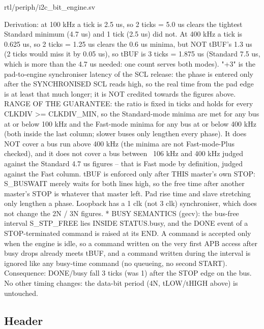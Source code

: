 \begin{relocated}{rtl/periph/i2c_bit_engine.sv}
\begin{textblock}
    Derivation: at 100 kHz a tick is 2.5 us, so 2 ticks = 5.0 us clears the tightest Standard
    minimum (4.7 us) and 1 tick (2.5 us) did not. At 400 kHz a tick is 0.625 us, so 2 ticks =
    1.25 us clears the 0.6 us minima, but NOT tBUF's 1.3 us (2 ticks would miss it by 0.05 us), so
    tBUF is 3 ticks = 1.875 us (Standard 7.5 us, which is more than the 4.7 us needed: one count
    serves both modes). "+3" is the pad-to-engine synchroniser latency of the SCL release: the
    phase is entered only after the SYNCHRONISED SCL reads high, so the real time from the pad
    edge is at least that much longer; it is NOT credited towards the figures above.
    RANGE OF THE GUARANTEE: the ratio is fixed in ticks and holds for every CLKDIV >= CLKDIV_MIN,
    so the Standard-mode minima are met for any bus at or below 100 kHz and the Fast-mode minima
    for any bus at or below 400 kHz (both inside the last column; slower buses only lengthen
    every phase). It does NOT cover a bus run above 400 kHz (the minima are not Fast-mode-Plus
    checked), and it does not cover a bus between ~106 kHz and 400 kHz judged against the Standard
    4.7 us figures -- that is Fast mode by definition, judged against the Fast column. tBUF is
    enforced only after THIS master's own STOP: S_BUSWAIT merely waits for both lines high, so the
    free time after another master's STOP is whatever that master left. Pad rise time and slave
    stretching only lengthen a phase. Loopback has a 1 clk (not 3 clk) synchroniser, which does
    not change the 2N / 3N figures.
  * BUSY SEMANTICS (gecv): the bus-free interval S_STP_FREE lies INSIDE STATUS.busy, and the DONE
    event of a STOP-terminated command is raised at its END. A command is accepted only when the
    engine is idle, so a command written on the very first APB access after busy drops already
    meets tBUF, and a command written during the interval is ignored like any busy-time command
    (no queueing, no second START). Consequence: DONE/busy fall 3 ticks (was 1) after the STOP
    edge on the bus. No other timing changes: the data-bit period (4N, tLOW/tHIGH above) is
    untouched.
\end{textblock}

\subsection*{Header}


\end{relocated}
